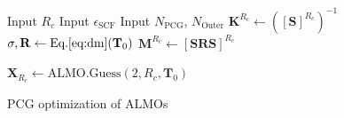 \documentclass[aip,jcp,reprint,amsmath,amssymb]{revtex4-1}
\begin{document}
\begin{figure}
\begin{algorithm}[H]
  \caption{PCG optimization of ALMOs}
  \label{alg:almoR}
   \begin{algorithmic}[1]
	\State Input $R_c$ 
	\State Input $\epsilon_{\text{SCF}}$ 
	\State Input $N_{\text{PCG}}$, $N_{\text{Outer}}$ 
	\State $\mathbf{K}^{R_c} \gets ([\mathbf{S}]^{R_c})^{-1}$ 
	\State $\mathbf{\sigma,R} \gets \text{Eq.\ref{eq:dm}}(\mathbf{T}_{0})$ 
	\State $\mathbf{M}^{R_c} \gets [\mathbf{SRS}]^{R_c}$ 
	
	\State $\mathbf{X}_{R_c} \gets \text{ALMO.Guess}(2, R_c, \mathbf{T}_0)$ 


\end{algorithmic}
\end{algorithm}
\end{figure}
\end{document}
